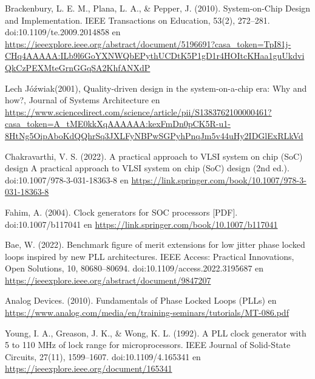 \documentclass[runningheads,a4paper]{llncs}
\begin{document}
\break
\begin{thebibliography}{4}
     Brackenbury, L. E. M., Plana, L. A., & Pepper, J. (2010). System-on-Chip Design and Implementation. IEEE Transactions on Education, 53(2), 272–281. doi:10.1109/te.2009.2014858 en \url{https://ieeexplore.ieee.org/abstract/document/5196691?casa_token=TpI81j-CHq4AAAAA:ILb9l6GoYXNWQbEPythUCDtK5P1gD1r4HOItcKHaa1guUkdviQkCzPEXMteGrnGGqSA2KhfANXdP}

     Lech Jóźwiak(2001), Quality-driven design in the system-on-a-chip era: Why and how?, Journal of Systems Architecture en \url{https://www.sciencedirect.com/science/article/pii/S1383762100000461?casa_token=A_tME0kkXqAAAAAA:kexFmDn0pCK5R-u1-8HtNg5OipAboKdQQhrSq3JXLFyNBPwSGPyhPnqJm5v44uHy2IDGlExRLkVd}

     Chakravarthi, V. S. (2022). A practical approach to VLSI system on chip (SoC) design A practical approach to VLSI system on chip (SoC) design (2nd ed.). doi:10.1007/978-3-031-18363-8 en \url{https://link.springer.com/book/10.1007/978-3-031-18363-8}

     Fahim, A. (2004). Clock generators for SOC processors [PDF]. doi:10.1007/b117041 en \url{https://link.springer.com/book/10.1007/b117041}

     Bae, W. (2022). Benchmark figure of merit extensions for low jitter phase locked loops inspired by new PLL architectures. IEEE Access: Practical Innovations, Open Solutions, 10, 80680–80694. doi:10.1109/access.2022.3195687 en \url{https://ieeexplore.ieee.org/abstract/document/9847207}

     Analog Devices. (2010). Fundamentals of Phase Locked Loops (PLLs) en \url{https://www.analog.com/media/en/training-seminars/tutorials/MT-086.pdf}

     Young, I. A., Greason, J. K., & Wong, K. L. (1992). A PLL clock generator with 5 to 110 MHz of lock range for microprocessors. IEEE Journal of Solid-State Circuits, 27(11), 1599–1607. doi:10.1109/4.165341 en \url{https://ieeexplore.ieee.org/document/165341}

\end{thebibliography}
\printbibliography
\end{document}

